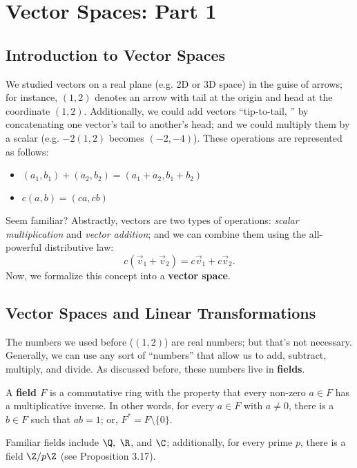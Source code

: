 \documentclass[math1530-lecture-notes]{subfiles}
\begin{document}
\chapter{Vector Spaces: Part 1}

\section{Introduction to Vector Spaces}

We studied vectors on a real plane (e.g. 2D or 3D space) in the guise of arrows; for instance,
$(1,2)$ denotes an arrow with tail at the origin and head at the coordinate $(1,2)$. Additionally,
we could add vectors ``tip-to-tail, '' by concatenating one vector's tail to another's head; and we
could multiply them by a scalar (e.g. $-2(1,2)$ becomes $(-2,-4)$). These operations are represented
as follows:
\begin{itemize}
  \item $(a_1,b_1)+(a_2,b_2)=(a_1+a_2,b_1+b_2)$
  \item $c(a,b)=(ca,cb)$
\end{itemize}

Seem familiar? Abstractly, vectors are two types of operations: \textit{scalar multiplication} and
\textit{vector addition}; and we can combine them using the all-powerful distributive law: \[
  c(\vec{v}_1+\vec{v}_2)=c\vec{v}_1+c\vec{v}_2
.\] 
Now, we formalize this concept into a \textbf{vector space}.

\section{Vector Spaces and Linear Transformations}
The numbers we used before ($(1,2)$) are real numbers; but that's not necessary. Generally, we can
use any sort of ``numbers'' that allow us to add, subtract, multiply, and divide. As discussed
before, these numbers live in \textbf{fields}.
\begin{definition}[Fields]{}
  A \textbf{field $F$} is a commutative ring with the property that every non-zero $a\in F$ has a
  multiplicative inverse. In other words, for every $a\in F$ with $a\neq 0$, there is a $b\in F$
  such that $ab=1$; or, $F^*=F\setminus \{0\}$.
\end{definition}

Familiar fields include $\Q,\ \R$, and $\C$; additionally, for every prime $p$, there is a field $\Z
/ p\Z$ (see Proposition 3.17).\\
\end{document}
